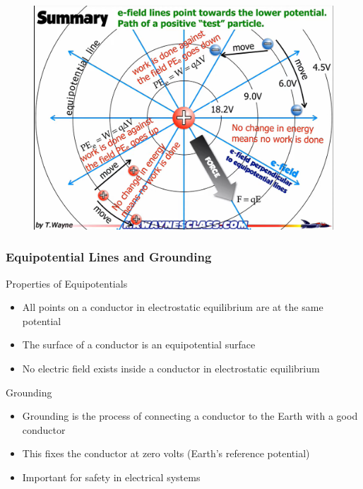 \documentclass{beamer}
\begin{document}
\begin{frame}{}
    

\begin{figure}
    \centering
    \includegraphics[width=0.75\linewidth]{equippt.png}
\end{figure}
\end{frame}

\begin{frame}
    \frametitle{Equipotential Lines and Grounding}
    
    \begin{block}{Properties of Equipotentials}
        \begin{itemize}
            \item All points on a conductor in electrostatic equilibrium are at the same potential
            \item The surface of a conductor is an equipotential surface
            \item No electric field exists inside a conductor in electrostatic equilibrium
        \end{itemize}
    \end{block}

    
    \begin{block}{Grounding}
        \begin{itemize}
            \item Grounding is the process of connecting a conductor to the Earth with a good conductor
            \item This fixes the conductor at zero volts (Earth's reference potential)
            \item Important for safety in electrical systems
        \end{itemize}
    \end{block}
\end{frame}
\end{document}
